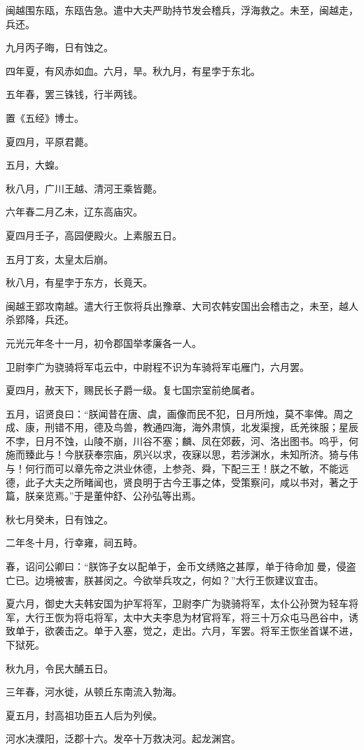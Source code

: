 \documentclass[]{article}
\begin{document}
闽越围东瓯，东瓯告急。遣中大夫严助持节发会稽兵，浮海救之。未至，闽越走，兵还。

九月丙子晦，日有蚀之。

四年夏，有风赤如血。六月，旱。秋九月，有星孛于东北。

五年春，罢三铢钱，行半两钱。

置《五经》博士。

夏四月，平原君薨。

五月，大蝗。

秋八月，广川王越、清河王乘皆薨。

六年春二月乙未，辽东高庙灾。

夏四月壬子，高园便殿火。上素服五日。

五月丁亥，太皇太后崩。

秋八月，有星孛于东方，长竟天。

闽越王郢攻南越。遣大行王恢将兵出豫章、大司农韩安国出会稽击之，未至，越人杀郢降，兵还。

元光元年冬十一月，初令郡国举孝廉各一人。

卫尉李广为骁骑将军屯云中，中尉程不识为车骑将军屯雁门，六月罢。

夏四月，赦天下，赐民长子爵一级。复七国宗室前绝属者。

五月，诏贤良曰：``朕闻昔在唐、虞，画像而民不犯，日月所烛，莫不率俾。周之成、康，刑错不用，德及鸟兽，教通四海，海外肃慎，北发渠搜，氐羌徠服；星辰不孛，日月不蚀，山陵不崩，川谷不塞；麟、凤在郊薮，河、洛出图书。呜乎，何施而臻此与！今朕获奉宗庙，夙兴以求，夜寐以思，若涉渊水，未知所济。猗与伟与！何行而可以章先帝之洪业休德，上参尧、舜，下配三王！朕之不敏，不能远德，此子大夫之所睹闻也，贤良明于古今王事之体，受策察问，咸以书对，著之于篇，朕亲览焉。''于是董仲舒、公孙弘等出焉。

秋七月癸未，日有蚀之。

二年冬十月，行幸雍，祠五畤。

春，诏问公卿曰：``朕饰子女以配单于，金币文绣赂之甚厚，单于待命加曼，侵盗亡已。边境被害，朕甚闵之。今欲举兵攻之，何如？''大行王恢建议宜击。

夏六月，御史大夫韩安国为护军将军，卫尉李广为骁骑将军，太仆公孙贺为轻车将军，大行王恢为将屯将军，太中大夫李息为材官将军，将三十万众屯马邑谷中，诱致单于，欲袭击之。单于入塞，觉之，走出。六月，军罢。将军王恢坐首谋不进，下狱死。

秋九月，令民大酺五日。

三年春，河水徙，从顿丘东南流入勃海。

夏五月，封高祖功臣五人后为列侯。

河水决濮阳，泛郡十六。发卒十万救决河。起龙渊宫。
\end{document}
